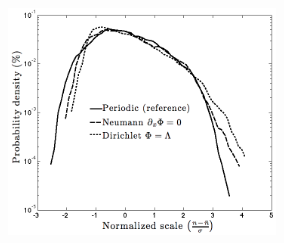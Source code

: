 \documentclass[a4paper,12pt]{article} %
\begin{document}
\thispagestyle{empty}

\begin{figure}[h!]
\center
\caption[PDF of density at a midpoint between the center of the source ($x=x_S$) and the wall. The three cases studied 
in section 4 (bi-periodic, Neumann and Dirichlet boundary conditions) are compared.]{}
\includegraphics[height=60mm,width=75mm]{figures/FigurePSI2012_8_P1-50_Futtersack.png}
\label{pdfN2}
\end{figure}
\end{document}

